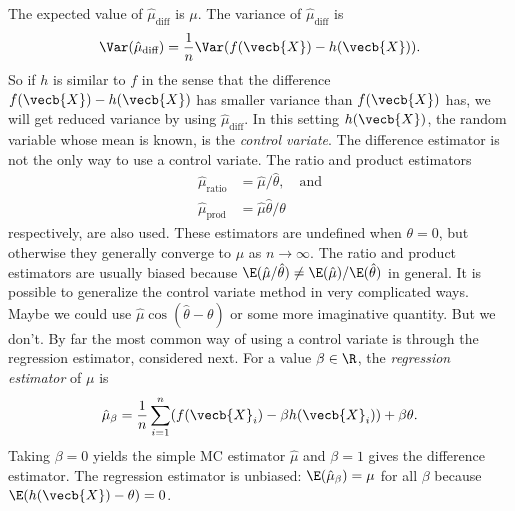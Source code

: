 The expected value of \(\hat{\mu}_{\text{diff}}\) is \(\mu\). The variance of \(\hat{\mu}_{\text{diff}}\) is
\begin{equation}
	\Var(\hat{\mu}_{\text{diff}}) = \frac{1}{n} \Var(f(\vecb{X}) - h(\vecb{X})).
	\label{eq:DifferenceEstimatorVariance}
\end{equation}
So if \(h\) is similar to \(f\) in the sense that the difference \(f(\vecb{X}) - h(\vecb{X})\) has smaller variance than \(f(\vecb{X})\) has, we will get reduced variance by using \(\hat{\mu}_{\text{diff}}\). In this setting \(h(\vecb{X})\), the random variable whose mean is known, is the \textit{control variate}. The difference estimator is not the only way to use a control variate. The ratio and product estimators
\begin{align}
	\hat{\mu}_{\text{ratio}} & = \hat{\mu} / \hat{\theta}, \quad \text{and} \label{eq:RatioEstimator} \\
	\hat{\mu}_{\text{prod}}  & = \hat{\mu} \hat{\theta} / \theta \label{eq:ProductEstimator}
\end{align}
respectively, are also used. These estimators are undefined when \(\theta = 0\), but otherwise they generally converge to \(\mu\) as \(n \to \infty\). The ratio and product estimators are usually biased because \(\E(\hat{\mu} / \hat{\theta}) \neq \E(\hat{\mu}) / \E(\hat{\theta})\) in general. It is possible to generalize the control variate method in very complicated ways. Maybe we could use \(\hat{\mu} \cos(\hat{\theta} - \theta)\) or some more imaginative quantity. But we don't. By far the most common way of using a control variate is through the regression estimator, considered next.
For a value \(\beta \in \R\), the \textit{regression estimator} of \(\mu\) is
\begin{equation}
	\hat{\mu}_{\beta} = \frac{1}{n} \sum_{i=1}^n (f(\vecb{X}_i) - \beta h(\vecb{X}_i)) + \beta \theta.
	\label{eq:RegressionEstimator}
\end{equation}
Taking \(\beta = 0\) yields the simple MC estimator \(\hat{\mu}\) and \(\beta = 1\) gives the difference estimator. The regression estimator is unbiased: \(\E(\hat{\mu}_{\beta}) = \mu\) for all \(\beta\) because \(\E(h(\vecb{X}) - \theta) = 0\).

